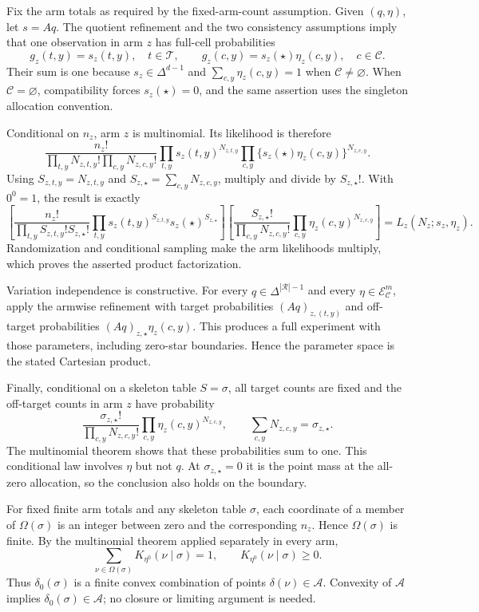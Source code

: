 Fix the arm totals as required by the fixed-arm-count assumption.  Given \((q,\eta)\), let \(s=Aq\).  The quotient refinement and the two consistency assumptions imply that one observation in arm \(z\) has full-cell probabilities
\[
g_z(t,y)=s_z(t,y),\quad t\in\mathcal T,
\qquad
g_z(c,y)=s_z(\star)\eta_z(c,y),\quad c\in\mathcal C.
\]
Their sum is one because \(s_z\in\Delta^{d-1}\) and \(\sum_{c,y}\eta_z(c,y)=1\) when \(\mathcal C\ne\varnothing\).  When \(\mathcal C=\varnothing\), compatibility forces \(s_z(\star)=0\), and the same assertion uses the singleton allocation convention.

Conditional on \(n_z\), arm \(z\) is multinomial.  Its likelihood is therefore
\[
\frac{n_z!}{\prod_{t,y}N_{z,t,y}!\prod_{c,y}N_{z,c,y}!}
\prod_{t,y}s_z(t,y)^{N_{z,t,y}}
\prod_{c,y}\{s_z(\star)\eta_z(c,y)\}^{N_{z,c,y}}.
\]
Using \(S_{z,t,y}=N_{z,t,y}\) and \(S_{z,\star}=\sum_{c,y}N_{z,c,y}\), multiply and divide by \(S_{z,\star}!\).  With \(0^0=1\), the result is exactly
\[
\left[
\frac{n_z!}{\prod_{t,y}S_{z,t,y}!S_{z,\star}!}
\prod_{t,y}s_z(t,y)^{S_{z,t,y}}s_z(\star)^{S_{z,\star}}
\right]
\left[
\frac{S_{z,\star}!}{\prod_{c,y}N_{z,c,y}!}
\prod_{c,y}\eta_z(c,y)^{N_{z,c,y}}
\right]
=L_z(N_z;s_z,\eta_z).
\]
Randomization and conditional sampling make the arm likelihoods multiply, which proves the asserted product factorization.

Variation independence is constructive.  For every \(q\in\Delta^{|\mathcal R|-1}\) and every \(\eta\in\mathcal E_{\mathcal C}^m\), apply the armwise refinement with target probabilities \((Aq)_{z,(t,y)}\) and off-target probabilities \((Aq)_{z,\star}\eta_z(c,y)\).  This produces a full experiment with those parameters, including zero-star boundaries.  Hence the parameter space is the stated Cartesian product.

Finally, conditional on a skeleton table \(S=\sigma\), all target counts are fixed and the off-target counts in arm \(z\) have probability
\[
\frac{\sigma_{z,\star}!}{\prod_{c,y}N_{z,c,y}!}
\prod_{c,y}\eta_z(c,y)^{N_{z,c,y}},
\qquad \sum_{c,y}N_{z,c,y}=\sigma_{z,\star}.
\]
The multinomial theorem shows that these probabilities sum to one.  This conditional law involves \(\eta\) but not \(q\).  At \(\sigma_{z,\star}=0\) it is the point mass at the all-zero allocation, so the conclusion also holds on the boundary.

For fixed finite arm totals and any skeleton table \(\sigma\), each coordinate of a member of \(\Omega(\sigma)\) is an integer between zero and the corresponding \(n_z\).  Hence \(\Omega(\sigma)\) is finite.  By the multinomial theorem applied separately in every arm,
\[
\sum_{\nu\in\Omega(\sigma)}K_{\eta^0}(\nu\mid\sigma)=1,
\qquad K_{\eta^0}(\nu\mid\sigma)\ge0.
\]
Thus \(\delta_0(\sigma)\) is a finite convex combination of points \(\delta(\nu)\in\mathcal A\).  Convexity of \(\mathcal A\) implies \(\delta_0(\sigma)\in\mathcal A\); no closure or limiting argument is needed.

